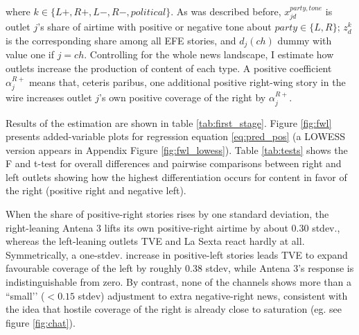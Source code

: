 \documentclass[12pt]{article}
\begin{document}
where $k \in\{L+,R+,L-,R-, political\}$. As was described before,  $x^{party, tone}_{jd}$ is outlet $j$’s share of airtime with positive or negative tone about $party \in \{L,R\}$;  $z^{k}_d$ is the corresponding share among all EFE stories, and $d_j(ch)$ dummy with value one if $j=ch$.  Controlling for the whole news landscape, I estimate how outlets increase the production of content of each type. 
A positive coefficient $\alpha_{j}^{R+}$ means that, ceteris paribus, one additional positive right-wing story in the wire increases outlet $j$’s own positive coverage of the right by $\alpha_{j}^{R+}$.

Results of the estimation are shown in table \ref{tab:first_stage}. Figure \ref{fig:fwl} presents added-variable plots for regression equation  \eqref{eq:pred_pos} (a LOWESS version appears in Appendix Figure \ref{fig:fwl_lowess}).  Table \ref{tab:tests} shows the F and t-test for overall differences and pairwise comparisons between right and left outlets showing how the highest differentiation occurs for content in favor of the right (positive right and negative left).

 When the share of  positive-right stories rises by one standard deviation, the right-leaning Antena 3 lifts its own positive-right airtime by about 0.30 stdev., whereas the left-leaning outlets TVE and La Sexta react hardly at all.  Symmetrically, a one-stdev. increase in positive-left stories leads TVE to expand favourable coverage of the left by roughly 0.38 stdev, while Antena 3’s response is indistinguishable from zero.  By contrast, none of the channels shows more than a “small’’ (\(<0.15\) stdev) adjustment to extra negative-right news, consistent with the idea that hostile coverage of the right is already close to saturation (eg. see figure \ref{fig:chat}). 


	
	
\end{document}
